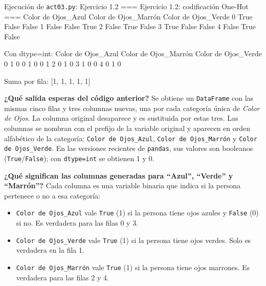 \documentclass[11pt,letterpaper]{article}
\begin{document}
\begin{consola}[label=out:ej12]{Ejecución de \texttt{act03.py}: Ejercicio 1.2}
=== Ejercicio 1.2: codificación One-Hot ===
   Color de Ojos_Azul  Color de Ojos_Marrón  Color de Ojos_Verde
0                True                 False                False
1               False                 False                 True
2               False                  True                False
3                True                 False                False
4               False                  True                False

Con dtype=int:
   Color de Ojos_Azul  Color de Ojos_Marrón  Color de Ojos_Verde
0                   1                     0                    0
1                   0                     0                    1
2                   0                     1                    0
3                   1                     0                    0
4                   0                     1                    0

Suma por fila: [1, 1, 1, 1, 1]
\end{consola}

\textbf{¿Qué salida esperas del código anterior?} Se obtiene un \texttt{DataFrame} con las mismas cinco filas y tres columnas nuevas, una por cada categoría única de \textit{Color de Ojos}. La columna original desaparece y es sustituida por estas tres. Las columnas se nombran con el prefijo de la variable original y aparecen en orden alfabético de la categoría: \texttt{Color de Ojos\_Azul}, \texttt{Color de Ojos\_Marrón} y \texttt{Color de Ojos\_Verde}. En las versiones recientes de \texttt{pandas}, sus valores son booleanos (\texttt{True}/\texttt{False}); con \texttt{dtype=int} se obtienen 1 y 0.

\textbf{¿Qué significan las columnas generadas para ``Azul'', ``Verde'' y ``Marrón''?} Cada columna es una variable binaria que indica si la persona pertenece o no a esa categoría:

\begin{itemize}
    \item \texttt{Color de Ojos\_Azul} vale \texttt{True} (1) si la persona tiene ojos azules y \texttt{False} (0) si no. Es verdadera para las filas 0 y 3.
    \item \texttt{Color de Ojos\_Verde} vale \texttt{True} (1) si la persona tiene ojos verdes. Solo es verdadera en la fila 1.
    \item \texttt{Color de Ojos\_Marrón} vale \texttt{True} (1) si la persona tiene ojos marrones. Es verdadera para las filas 2 y 4.
\end{itemize}
\end{document}
